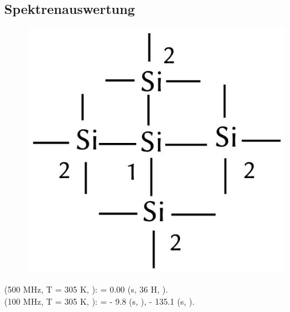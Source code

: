 \documentclass[12pt]{article}
\begin{document}
\begin{onehalfspace}
\section{Spektrenauswertung}
\begin{figure}[!ht]
   \centering
\includegraphics[scale=0.3]{auswert.png}
\end{figure}
\noindent
\textbf{} (500 MHz, T = 305 \si{\kelvin}, ): \sffamily \ce{$\delta$} =
0.00 (s, 36 H, ). \\
\noindent
\textbf{} (100 MHz, T = 305 \si{\kelvin}, ): \sffamily \ce{$\delta$} =
- 9.8 (s, ),
- 135.1 (s, ).



\end{onehalfspace}
\end{document}
